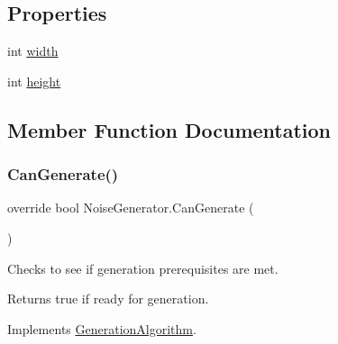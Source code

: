 \subsection*{Properties}
\begin{DoxyCompactItemize}
\item 
int \mbox{\hyperlink{class_noise_generator_abf59a5335539de9b8a38feca31f8ffe5}{width}}
\item 
int \mbox{\hyperlink{class_noise_generator_a73fd14bf579ffcf3118b81be3107c0d5}{height}}
\end{DoxyCompactItemize}


\subsection{Member Function Documentation}
\mbox{\label{class_noise_generator_a9f6eefc7403c8d228dc1752086e8c745}} 
\subsubsection{\texorpdfstring{Can\+Generate()}{CanGenerate()}}
{\footnotesize\ttfamily override bool Noise\+Generator.\+Can\+Generate (\begin{DoxyParamCaption}{ }\end{DoxyParamCaption})\hspace{0.3cm}{\ttfamily [virtual]}}



Checks to see if generation prerequisites are met. 

\begin{DoxyReturn}{Returns}
true if ready for generation.
\end{DoxyReturn}


Implements \mbox{\hyperlink{class_generation_algorithm_af7d03e24e3b7fecfe2ae43f06915986d}{Generation\+Algorithm}}.

\mbox{\label{class_noise_generator_af97b78b12d39a0ae2d05e1d28c970005}} 

